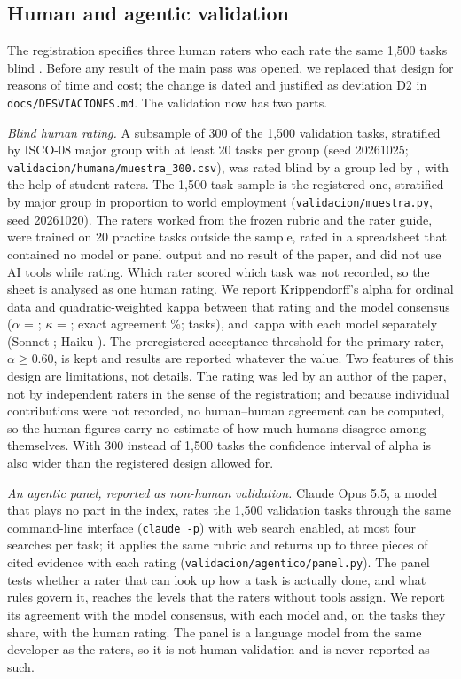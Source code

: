 \subsection{Human and agentic validation}
\label{sec:validacion_humana}

The registration specifies three human raters who each rate the same 1,500 tasks blind \prerregcita.
Before any result of the main pass was opened, we replaced that design for reasons of time and cost; the change is dated and justified as deviation D2 in \texttt{docs/DESVIACIONES.md}.
The validation now has two parts.

\emph{Blind human rating.}
A subsample of 300 of the 1,500 validation tasks, stratified by ISCO-08 major group with at least 20 tasks per group (seed 20261025; \texttt{validacion/humana/muestra\_300.csv}), was rated blind by a group led by \liderhumano, with the help of student raters.
The 1,500-task sample is the registered one, stratified by major group in proportion to world employment (\texttt{validacion/muestra.py}, seed 20261020).
The raters worked from the frozen rubric and the rater guide, were trained on 20 practice tasks outside the sample, rated in a spreadsheet that contained no model or panel output and no result of the paper, and did not use AI tools while rating.
Which rater scored which task was not recorded, so the sheet is analysed as one human rating.
We report Krippendorff's alpha for ordinal data \citep{krippendorff2004reliability} and quadratic-weighted kappa \citep{cohen1968weighted} between that rating and the model consensus ($\alpha$ = ; $\kappa$ = ; exact agreement \%;  tasks), and kappa with each model separately (Sonnet ; Haiku ).
The preregistered acceptance threshold for the primary rater, $\alpha \geq 0.60$, is kept and results are reported whatever the value.
Two features of this design are limitations, not details.
The rating was led by an author of the paper, not by independent raters in the sense of the registration; and because individual contributions were not recorded, no human--human agreement can be computed, so the human figures carry no estimate of how much humans disagree among themselves.
With 300 instead of 1,500 tasks the confidence interval of alpha is also wider than the registered design allowed for.

\emph{An agentic panel, reported as non-human validation.}
Claude Opus 5.5, a model that plays no part in the index, rates the 1,500 validation tasks through the same command-line interface (\texttt{claude -p}) with web search enabled, at most four searches per task; it applies the same rubric and returns up to three pieces of cited evidence with each rating (\texttt{validacion/agentico/panel.py}).
The panel tests whether a rater that can look up how a task is actually done, and what rules govern it, reaches the levels that the raters without tools assign.
We report its agreement with the model consensus, with each model and, on the tasks they share, with the human rating.
The panel is a language model from the same developer as the raters, so it is not human validation and is never reported as such.

